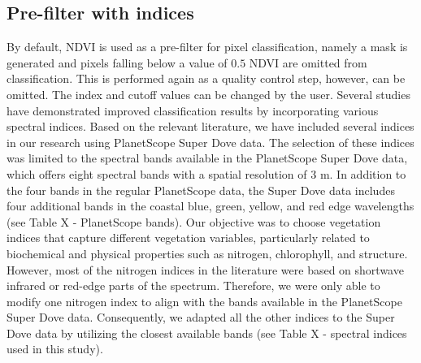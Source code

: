 \documentclass[9pt,lineno]{elife}
\begin{document}
\subsection{Pre-filter with indices}
By default, NDVI is used as a pre-filter for pixel classification, namely a mask is generated and pixels falling below a value of $0.5$ NDVI are omitted from classification. This is performed again as a quality control step, however, can be omitted. The index and cutoff values can be changed by the user.
Several studies have demonstrated improved classification results by incorporating various spectral indices. Based on the relevant literature, we have included several indices in our research using PlanetScope Super Dove data. The selection of these indices was limited to the spectral bands available in the PlanetScope Super Dove data, which offers eight spectral bands with a spatial resolution of 3 m. In addition to the four bands in the regular PlanetScope data, the Super Dove data includes four additional bands in the coastal blue, green, yellow, and red edge wavelengths (see Table X - PlanetScope bands). Our objective was to choose vegetation indices that capture different vegetation variables, particularly related to biochemical and physical properties such as nitrogen, chlorophyll, and structure. However, most of the nitrogen indices in the literature were based on shortwave infrared or red-edge parts of the spectrum. Therefore, we were only able to modify one nitrogen index to align with the bands available in the PlanetScope Super Dove data. Consequently, we adapted all the other indices to the Super Dove data by utilizing the closest available bands (see Table X - spectral indices used in this study).
\end{document}

